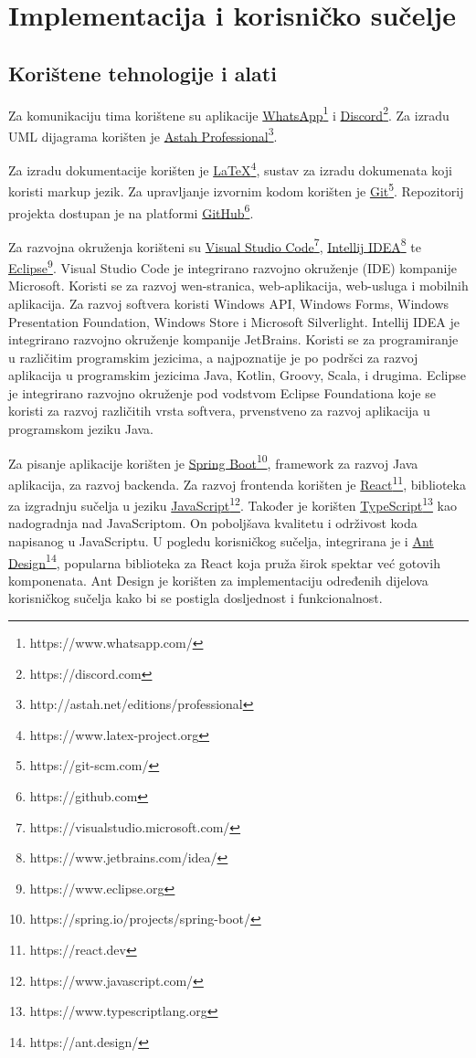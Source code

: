 \chapter{Implementacija i korisničko sučelje}


\section{Korištene tehnologije i alati}

\noindent Za komunikaciju tima korištene su aplikacije \underline{WhatsApp}\footnote{https://www.whatsapp.com/} i \underline{Discord}\footnote{https://discord.com}. Za izradu UML dijagrama korišten je \underline{Astah Professional}\footnote{http://astah.net/editions/professional}.

Za izradu dokumentacije korišten je \underline{LaTeX}\footnote{https://www.latex-project.org}, sustav za izradu dokumenata koji koristi markup jezik. Za upravljanje izvornim kodom korišten je \underline{Git}\footnote{https://git-scm.com/}. Repozitorij projekta dostupan je na platformi \underline{GitHub}\footnote{https://github.com}.

Za razvojna okruženja korišteni su \underline{Visual Studio Code}\footnote{https://visualstudio.microsoft.com/}, \underline{Intellij IDEA}\footnote{https://www.jetbrains.com/idea/} te \underline{Eclipse}\footnote{https://www.eclipse.org}. Visual Studio Code je integrirano razvojno okruženje (IDE) kompanije Microsoft. Koristi se za razvoj wen-stranica, web-aplikacija, web-usluga i mobilnih aplikacija. Za razvoj softvera koristi Windows API, Windows Forms, Windows Presentation Foundation, Windows Store i Microsoft Silverlight. Intellij IDEA je integrirano razvojno okruženje kompanije JetBrains. Koristi se za programiranje u različitim programskim jezicima, a najpoznatije je po podršci za razvoj aplikacija u programskim jezicima Java, Kotlin, Groovy, Scala, i drugima. Eclipse je integrirano razvojno okruženje pod vodstvom Eclipse Foundationa koje se koristi za razvoj različitih vrsta softvera, prvenstveno za razvoj aplikacija u programskom jeziku Java.

Za pisanje aplikacije korišten je \underline{Spring Boot}\footnote{https://spring.io/projects/spring-boot/}, framework za razvoj Java aplikacija, za razvoj backenda. Za razvoj frontenda korišten je \underline{React}\footnote{https://react.dev}, biblioteka za izgradnju sučelja u jeziku \underline{JavaScript}\footnote{https://www.javascript.com/}. Također je korišten \underline{TypeScript}\footnote{https://www.typescriptlang.org} kao nadogradnja nad JavaScriptom. On poboljšava kvalitetu i održivost koda napisanog u JavaScriptu. U pogledu korisničkog sučelja, integrirana je i \underline{Ant Design}\footnote{https://ant.design/}, popularna biblioteka za React koja pruža širok spektar već gotovih komponenata. Ant Design je korišten za implementaciju određenih dijelova korisničkog sučelja kako bi se postigla dosljednost i funkcionalnost.

